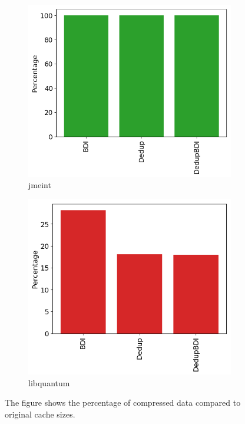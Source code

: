 \begin{figure}
    \begin{subfigure}{0.5\textwidth}
        \includegraphics[width=\textwidth]{jmeint.png}
        \caption{jmeint}
        \label{fig:jmeint}
    \end{subfigure}
    \begin{subfigure}{0.5\textwidth}
        \includegraphics[width=\textwidth]{libquantum.png}
        \caption{libquantum}
        \label{fig:libquantum}
    \end{subfigure}
    \caption[Compression in benchmarks]{The figure shows the percentage of compressed data compared to original cache sizes.}
\end{figure}
